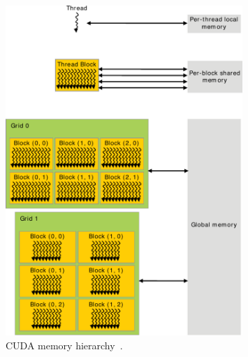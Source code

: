 \begin{figure}[!htbp]
  \centering
  \includegraphics[width=0.8\textwidth]{img/memory_hierarchy.pdf}
  \caption[CUDA memory hierarchy.]{CUDA memory hierarchy~\cite{CudaProgrammingGuide}.}
  \label{fig:memory_hierarchy}
\end{figure}
